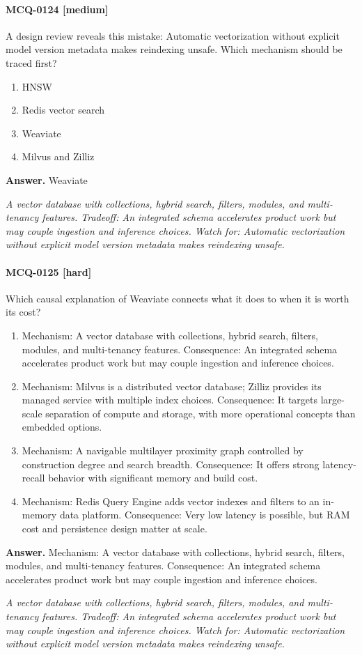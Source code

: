 \paragraph{MCQ-0124 [medium]} A design review reveals this mistake: Automatic vectorization without explicit model version metadata makes reindexing unsafe. Which mechanism should be traced first?
\begin{enumerate}[label=\Alph*.]
\item HNSW
\item Redis vector search
\item Weaviate
\item Milvus and Zilliz
\end{enumerate}
\noindent\textbf{Answer.} Weaviate
\par\textit{A vector database with collections, hybrid search, filters, modules, and multi-tenancy features. Tradeoff: An integrated schema accelerates product work but may couple ingestion and inference choices. Watch for: Automatic vectorization without explicit model version metadata makes reindexing unsafe.}
\paragraph{MCQ-0125 [hard]} Which causal explanation of Weaviate connects what it does to when it is worth its cost?
\begin{enumerate}[label=\Alph*.]
\item Mechanism: A vector database with collections, hybrid search, filters, modules, and multi-tenancy features. Consequence: An integrated schema accelerates product work but may couple ingestion and inference choices.
\item Mechanism: Milvus is a distributed vector database; Zilliz provides its managed service with multiple index choices. Consequence: It targets large-scale separation of compute and storage, with more operational concepts than embedded options.
\item Mechanism: A navigable multilayer proximity graph controlled by construction degree and search breadth. Consequence: It offers strong latency-recall behavior with significant memory and build cost.
\item Mechanism: Redis Query Engine adds vector indexes and filters to an in-memory data platform. Consequence: Very low latency is possible, but RAM cost and persistence design matter at scale.
\end{enumerate}
\noindent\textbf{Answer.} Mechanism: A vector database with collections, hybrid search, filters, modules, and multi-tenancy features. Consequence: An integrated schema accelerates product work but may couple ingestion and inference choices.
\par\textit{A vector database with collections, hybrid search, filters, modules, and multi-tenancy features. Tradeoff: An integrated schema accelerates product work but may couple ingestion and inference choices. Watch for: Automatic vectorization without explicit model version metadata makes reindexing unsafe.}
